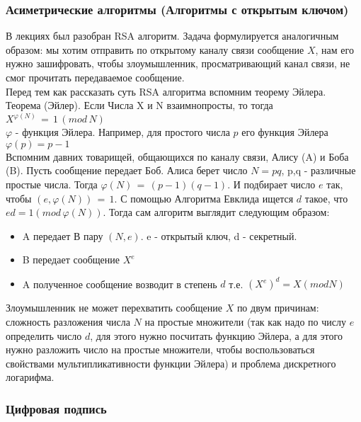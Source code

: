 \subsubsection{Асиметрические алгоритмы (Алгоритмы с открытым ключом)}

В лекциях был разобран  RSA алгоритм. Задача формулируется аналогичным образом: мы хотим отправить по открытому каналу связи сообщение $X$, нам его нужно зашифровать, чтобы злоумышленник, просматривающий канал связи, не смог прочитать передаваемое сообщение. \\

Перед тем как рассказать суть RSA алгоритма вспомним теорему Эйлера. \\
Теорема (Эйлер). Если Числа X и N взаимнопросты, то тогда $X^{\varphi (N)} \, = \, 1 \, (mod \, N)$ \\
$\varphi$ - функция Эйлера. Например, для простого числа $p$ его функция Эйлера $\varphi (p) = p - 1$ \\

Вспомним давних товарищей, общающихся по каналу связи, Алису (A) и Боба (B). Пусть сообщение передает Боб.
Алиса берет число $N = pq$, p,q - различные простые числа. Тогда $\varphi (N) \, = \, (p - 1)(q - 1)$. И подбирает число $e$ так, чтобы $(e, \varphi(N)) \, = \,1$. С помощью Алгоритма Евклида ищется $d$ такое, что  $ed = 1 (mod \, \varphi (N))$. Тогда сам алгоритм выглядит следующим образом:
\begin {itemize}
\item A передает В пару $(N, e)$. e - открытый ключ, d - секретный.
\item B передает сообщение $X^e$
\item A полученное сообщение возводит в степень $d$ т.е. $(X^e)^d = X (mod N)$
\end {itemize}

Злоумышленник не может перехватить сообщение $X$ по двум причинам: сложность разложения числа $N$ на простые множители (так как надо по числу $e$ определить число $d$, для этого нужно посчитать функцию Эйлера, а для этого нужно разложить число на простые множители, чтобы воспользоваться свойствами мультипликативности функции Эйлера) и проблема дискретного логарифма.

\subsubsection{Цифровая подпись}


